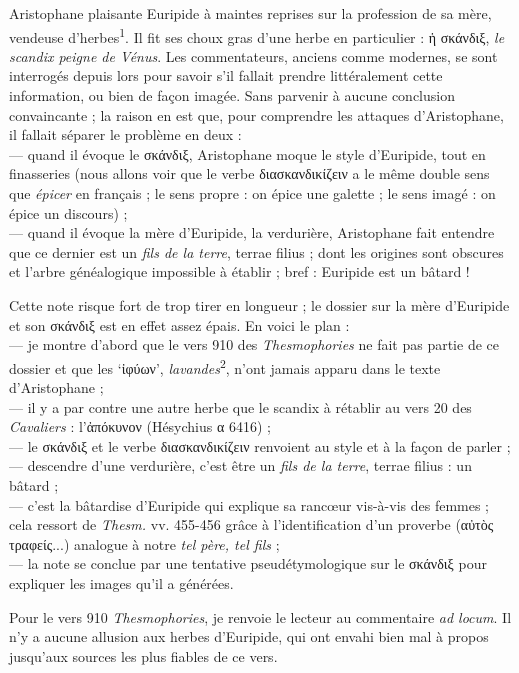\documentclass[12pt]{book}%
\newcommand{\italique}[1]{\textit{#1}}%
\newcommand{\latin}[1]{{\policeLat #1}}%
\newcommand{\marqueur}[1]{\textsuperscript{#1}}%
\newenvironment{groupe}{%
\pstart%
\ledgroup%
}{%
\pend %
}%
\begin{document}
\begin{pages}
\begin{Leftside}
\begin{groupe}
{{Aristophane plaisante Euripide à maintes reprises sur la profession de sa mère, vendeuse d'herbes\marqueur{1}. Il fit ses choux gras d'une herbe en particulier : ἡ σκάνδιξ, \italique{le scandix peigne de Vénus}. Les commentateurs, anciens comme modernes, se sont interrogés depuis lors pour savoir s'il fallait prendre littéralement cette information, ou bien de façon imagée.
Sans parvenir à aucune conclusion convaincante ; la raison en est que, pour comprendre les attaques d'Aristophane, il fallait séparer le problème en deux :\\
--- quand il évoque le σκάνδιξ, Aristophane moque le style d'Euripide, tout en finasseries (nous allons voir que le verbe διασκανδικίζειν a le même double sens que \italique{épicer} en français ; le sens propre : on épice une galette ; le sens imagé : on épice un discours) ;\\
--- quand il évoque la mère d'Euripide, la verdurière, Aristophane fait entendre que ce dernier est un \italique{fils de la terre}, \latin{terrae filius} ; dont les origines sont obscures et l'arbre généalogique impossible à établir ; bref : Euripide est un bâtard !


Cette note risque fort de trop tirer en longueur ; le dossier sur la mère d'Euripide et son σκάνδιξ est en effet assez épais. En voici le plan :\\
--- je montre d'abord que le vers 910 des \italique{Thesmophories} ne fait pas partie de ce dossier et que les `ἰφύων', \italique{lavandes}\marqueur{2}, n'ont jamais apparu dans le texte d'Aristophane ;\\
--- il y a par contre une autre herbe que le scandix à rétablir au vers 20 des \italique{Cavaliers} : l'ἀπόκυνον (Hésychius α 6416) ;\\
--- le σκάνδιξ et le verbe διασκανδικίζειν renvoient au style et à la façon de parler ;\\
--- descendre d'une verdurière, c'est être un \italique{fils de la terre}, \latin{terrae filius} : un bâtard ;\\
--- c'est la bâtardise d'Euripide qui explique sa rancœur vis-à-vis des femmes ; cela ressort de \italique{Thesm.} vv. 455-456 grâce à l'identification d'un proverbe (αὐτὸς τραφείς...) analogue à notre \italique{tel père, tel fils} ;\\
--- la note se conclue par une tentative pseudétymologique sur le σκάνδιξ pour expliquer les images qu'il a générées.



Pour le vers 910 \italique{Thesmophories}, je renvoie le lecteur au commentaire \italique{ad locum}. 
Il n'y a aucune allusion aux herbes d'Euripide, qui ont envahi bien mal à propos jusqu'aux sources les plus fiables de ce vers.

}}
\end{groupe}
\end{Leftside}
\end{pages}
\end{document}
